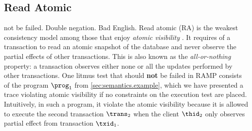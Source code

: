 \subsection{Read Atomic} 
\ac{not be failed. Double negation. Bad English.}
Read atomic (RA) \cite{ramp} is the weakest consistency model among those that enjoy \emph{atomic visibility} \cite{framework-concur}. 
It requires of a transaction to read an atomic snapshot of the database and never observe the partial effects of other transactions.
This is also known as the \emph{all-or-nothing} property: a transaction observes either none or all the updates performed by other transactions. 
One litmus test that should \textbf{not} be failed in RAMP consists of the program $\prog_1$ from \cref{sec:semantics.example}, which we have presented a trace violating atomic visibility if no constraints on the execution test are placed.
Intuitively, in such a program, it violate the atomic visibility because it is allowed to execute the second transaction \( \trans_2\) when the client $\thid_2$ only observes partial effect from transaction \( \txid_1 \).

